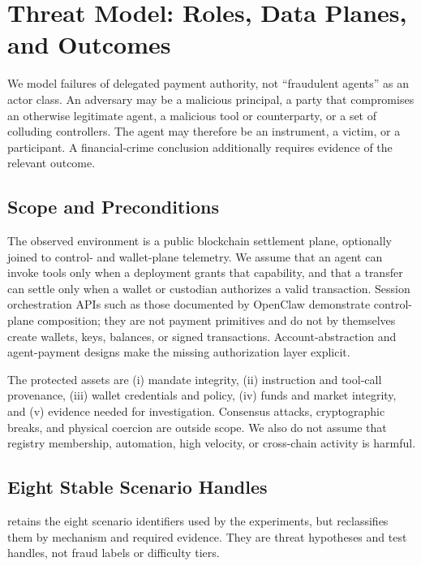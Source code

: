 
\section{Threat Model: Roles, Data Planes, and Outcomes}\label{sec:threat}

We model failures of delegated payment authority, not ``fraudulent agents'' as
an actor class.  An adversary may be a malicious principal, a party that
compromises an otherwise legitimate agent, a malicious tool or counterparty, or
a set of colluding controllers.  The agent may therefore be an instrument, a
victim, or a participant.  A financial-crime conclusion additionally requires
evidence of the relevant outcome.

\subsection{Scope and Preconditions}

The observed environment is a public blockchain settlement plane, optionally
joined to control- and wallet-plane telemetry.  We assume that an agent can
invoke tools only when a deployment grants that capability, and that a transfer
can settle only when a wallet or custodian authorizes a valid transaction.
Session orchestration APIs such as those documented by OpenClaw
\cite{openclaw2026} demonstrate control-plane composition; they are not payment
primitives and do not by themselves create wallets, keys, balances, or signed
transactions.  Account-abstraction and agent-payment designs make the missing
authorization layer explicit\cite{erc4337,ap2protocol2025,zhang2026sok}.

The protected assets are (i) mandate integrity, (ii) instruction and tool-call
provenance, (iii) wallet credentials and policy, (iv) funds and market
integrity, and (v) evidence needed for investigation.  Consensus attacks,
cryptographic breaks, and physical coercion are outside scope.  We also do not
assume that registry membership, automation, high velocity, or cross-chain
activity is harmful.

\subsection{Eight Stable Scenario Handles}

 retains the eight scenario identifiers used by the
experiments, but reclassifies them by mechanism and required evidence.  They
are threat hypotheses and test handles, not fraud labels or difficulty tiers.

